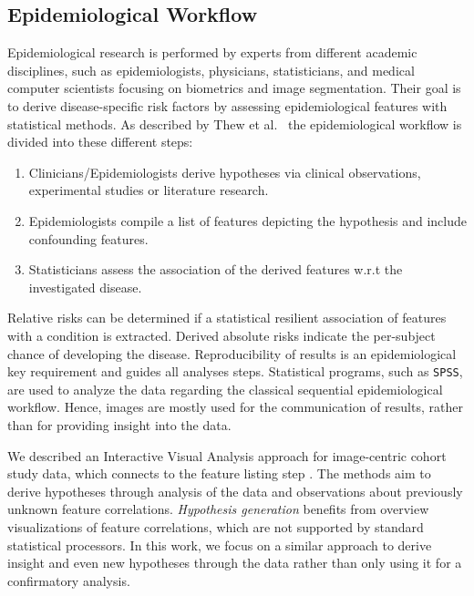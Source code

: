\documentclass[journal]{style/vgtc} 			          %
\begin{document}
\subsection{Epidemiological Workflow} \label{sec:EpidemiologicalWorkflow}
Epidemiological research is performed by experts from different academic disciplines, such as epidemiologists, physicians, statisticians, and medical computer scientists focusing on biometrics and image segmentation.
Their goal is to derive disease-specific risk factors by assessing epidemiological features with statistical methods.
As described by Thew et al.~\cite{Thew2009} the epidemiological workflow is divided into these different steps:
\begin{enumerate}
	\item Clinicians/Epidemiologists derive hypotheses via clinical observations, experimental studies or literature research.
	\item Epidemiologists compile a list of features depicting the hypothesis and include confounding features.
	\item Statisticians assess the association of the derived features w.r.t the investigated disease.
\end{enumerate}
Relative risks can be determined if a statistical resilient association of features with a condition is extracted.
Derived absolute risks indicate the per-subject chance of developing the disease.
Reproducibility of results is an epidemiological key requirement and guides all analyses steps.
Statistical programs, such as \texttt{SPSS}, are used to analyze the data regarding the classical sequential epidemiological workflow.
Hence, images are mostly used for the communication of results, rather than for providing insight into the data.

We described an Interactive Visual Analysis approach for image-centric cohort study data, which connects to the feature listing step \cite{Klemm2014VIS}.
The methods aim to derive hypotheses through analysis of the data and observations about previously unknown feature correlations.
\emph{Hypothesis generation} benefits from overview visualizations of feature correlations, which are not supported by standard statistical processors.
In this work, we focus on a similar approach to derive insight and even new hypotheses through the data rather than only using it for a confirmatory analysis.
\end{document}
